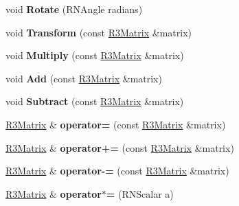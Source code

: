 \begin{DoxyCompactItemize}
\item 
void {\bfseries Rotate} (R\+N\+Angle radians)\hypertarget{class_r3_matrix_a0d551b8a34d36c70aa433be9097f8908}{}\label{class_r3_matrix_a0d551b8a34d36c70aa433be9097f8908}

\item 
void {\bfseries Transform} (const \hyperlink{class_r3_matrix}{R3\+Matrix} \&matrix)\hypertarget{class_r3_matrix_aa7e75ec6ea66778ba31ec5d9588cb065}{}\label{class_r3_matrix_aa7e75ec6ea66778ba31ec5d9588cb065}

\item 
void {\bfseries Multiply} (const \hyperlink{class_r3_matrix}{R3\+Matrix} \&matrix)\hypertarget{class_r3_matrix_a757cbb898a0d3d8d1ed628b101d0a1a4}{}\label{class_r3_matrix_a757cbb898a0d3d8d1ed628b101d0a1a4}

\item 
void {\bfseries Add} (const \hyperlink{class_r3_matrix}{R3\+Matrix} \&matrix)\hypertarget{class_r3_matrix_a03972a861819b531a0626e0b9f7ea302}{}\label{class_r3_matrix_a03972a861819b531a0626e0b9f7ea302}

\item 
void {\bfseries Subtract} (const \hyperlink{class_r3_matrix}{R3\+Matrix} \&matrix)\hypertarget{class_r3_matrix_a586c07bad57e82f870f71f41428dd68e}{}\label{class_r3_matrix_a586c07bad57e82f870f71f41428dd68e}

\item 
\hyperlink{class_r3_matrix}{R3\+Matrix} \& {\bfseries operator=} (const \hyperlink{class_r3_matrix}{R3\+Matrix} \&matrix)\hypertarget{class_r3_matrix_a1ec647a47d2a3bc1d85afa516686bfe7}{}\label{class_r3_matrix_a1ec647a47d2a3bc1d85afa516686bfe7}

\item 
\hyperlink{class_r3_matrix}{R3\+Matrix} \& {\bfseries operator+=} (const \hyperlink{class_r3_matrix}{R3\+Matrix} \&matrix)\hypertarget{class_r3_matrix_a41b6650421b24028befe341dcd7797eb}{}\label{class_r3_matrix_a41b6650421b24028befe341dcd7797eb}

\item 
\hyperlink{class_r3_matrix}{R3\+Matrix} \& {\bfseries operator-\/=} (const \hyperlink{class_r3_matrix}{R3\+Matrix} \&matrix)\hypertarget{class_r3_matrix_aeba9f9968b29c0c3f8f2a039787a0825}{}\label{class_r3_matrix_aeba9f9968b29c0c3f8f2a039787a0825}

\item 
\hyperlink{class_r3_matrix}{R3\+Matrix} \& {\bfseries operator$\ast$=} (R\+N\+Scalar a)\hypertarget{class_r3_matrix_a3a220a5f2496039afa439983161ef6b3}{}\label{class_r3_matrix_a3a220a5f2496039afa439983161ef6b3}


\end{DoxyCompactItemize}
